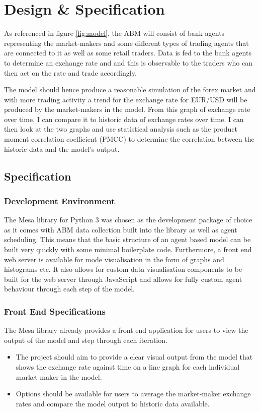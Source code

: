 \chapter{Design \& Specification}
As referenced in figure \ref{fig:model}, the ABM will consist of bank agents representing the market-makers and some different types of trading agents that are connected to it as well as some retail traders. Data is fed to the bank agents to determine an exchange rate and and this is observable to the traders who can then act on the rate and trade accordingly.

The model should hence produce a reasonable simulation of the forex market and with more trading activity a trend for the exchange rate for EUR/USD will be produced by the market-makers in the model. From this graph of exchange rate over time, I can compare it to historic data of exchange rates over time. I can then look at the two graphs and use statistical analysis such as the product moment correlation coefficient (PMCC) to determine the correlation between the historic data and the model's output.

\section{Specification}

\subsection{Development Environment}
The Mesa library for Python 3 was chosen as the development package of choice as it comes with ABM data collection built into the library as well as agent scheduling. This means that the basic structure of an agent based model can be built very quickly with some minimal boilerplate code. Furthermore, a front end web server is available for mode visualisation in the form of graphs and histograms etc. It also allows for custom data visualisation components to be built for the web server through JavaScript and allows for fully custom agent behaviour through each step of the model.

\subsection{Front End Specifications}
The Mesa library already provides a front end application for users to view the output of the model and step through each iteration. 
\begin{itemize}
\item The project should aim to provide a clear visual output from the model that shows the exchange rate against time on a line graph for each individual market maker in the model.
\item Options should be available for users to average the market-maker exchange rates and compare the model output to historic data available.
\end{itemize} 


